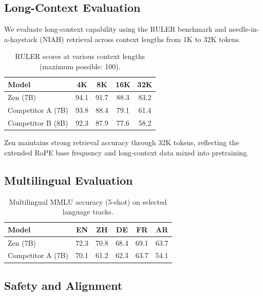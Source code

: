\documentclass[11pt,a4paper]{article}
\begin{document}
\subsection{Long-Context Evaluation}

We evaluate long-context capability using the RULER benchmark \cite{hsieh2024ruler} and
needle-in-a-haystack (NIAH) retrieval across context lengths from 1K to 32K tokens.

\begin{table}[H]
\centering
\caption{RULER scores at various context lengths (maximum possible: 100).}
\label{tab:longctx}
\begin{tabular}{lcccc}
\toprule
\textbf{Model} & \textbf{4K} & \textbf{8K} & \textbf{16K} & \textbf{32K} \\
\midrule
Zen (7B)           & 94.1 & 91.7 & 88.3 & 83.2 \\
Competitor A (7B)  & 93.8 & 88.4 & 79.1 & 61.4 \\
Competitor B (8B)  & 92.3 & 87.9 & 77.6 & 58.2 \\
\bottomrule
\end{tabular}
\end{table}

Zen maintains strong retrieval accuracy through 32K tokens, reflecting the extended RoPE base
frequency and long-context data mixed into pretraining.

\subsection{Multilingual Evaluation}

\begin{table}[H]
\centering
\caption{Multilingual MMLU accuracy (5-shot) on selected language tracks.}
\label{tab:multilingual}
\begin{tabular}{lccccc}
\toprule
\textbf{Model} & \textbf{EN} & \textbf{ZH} & \textbf{DE} & \textbf{FR} & \textbf{AR} \\
\midrule
Zen (7B)          & 72.3 & 70.8 & 68.4 & 69.1 & 63.7 \\
Competitor A (7B) & 70.1 & 61.2 & 62.3 & 63.7 & 54.1 \\
\bottomrule
\end{tabular}
\end{table}

\subsection{Safety and Alignment}
\end{document}

